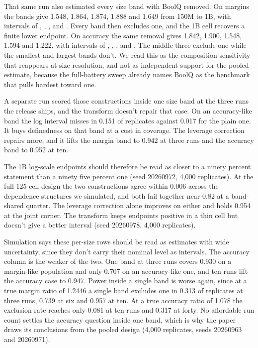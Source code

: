 That same run also estimated every size band with BoolQ removed. On margins the bands give 1.548, 1.864, 1.874, 1.888 and 1.649 from 150M to 1B, with intervals of , , ,  and . Every band then excludes one, and the 1B cell recovers a finite lower endpoint. On accuracy the same removal gives 1.842, 1.900, 1.548, 1.594 and 1.222, with intervals of , , ,  and . The middle three exclude one while the smallest and largest bands don't. We read this as the composition sensitivity that reappears at size resolution, and not as independent support for the pooled estimate, because the full-battery sweep already names BoolQ as the benchmark that pulls hardest toward one.

A separate run scored those constructions inside one size band at the three runs the release ships, and the transform doesn't repair that case. On an accuracy-like band the log interval misses in 0.151 of replicates against 0.017 for the plain one. It buys definedness on that band at a cost in coverage. The leverage correction repairs more, and it lifts the margin band to 0.942 at three runs and the accuracy band to 0.952 at ten.

The 1B log-scale endpoints should therefore be read as closer to a ninety percent statement than a ninety five percent one (seed 20260972, 4,000 replicates). At the full 125-cell design the two constructions agree within 0.006 across the dependence structures we simulated, and both fail together near 0.82 at a band-shared quarter. The leverage correction alone improves on either and holds 0.954 at the joint corner. The transform keeps endpoints positive in a thin cell but doesn't give a better interval (seed 20260978, 4,000 replicates).

Simulation says these per-size rows should be read as estimates with wide uncertainty, since they don't carry their nominal level as intervals. The accuracy column is the weaker of the two. One band at three runs covers 0.930 on a margin-like population and only 0.707 on an accuracy-like one, and ten runs lift the accuracy case to 0.947. Power inside a single band is worse again, since at a true margin ratio of 1.2446 a single band excludes one in 0.313 of replicates at three runs, 0.739 at six and 0.957 at ten. At a true accuracy ratio of 1.078 the exclusion rate reaches only 0.081 at ten runs and 0.317 at forty. No affordable run count settles the accuracy question inside one band, which is why the paper draws its conclusions from the pooled design (4,000 replicates, seeds 20260963 and 20260971).

